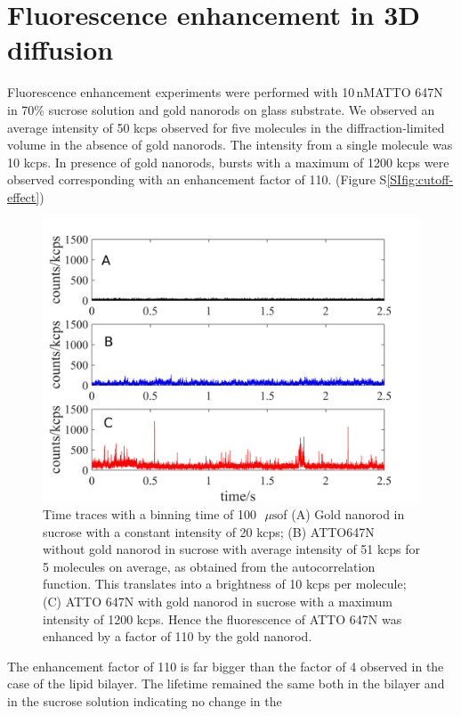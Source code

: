 \documentclass[11pt,a4paper,onecolumn]{article}
\newcommand{\nM}{\ensuremath{\,\textrm{nM}}}
\newcommand{\us}{\ensuremath{\,\mu\textrm{s}}}
\begin{document}
\section{Fluorescence enhancement in 3D diffusion}
Fluorescence enhancement experiments were performed with 10\nM ATTO 647N in 70\% sucrose solution and gold 
nanorods on glass substrate. We observed an average intensity of 50 kcps observed for five molecules in the 
diffraction-limited volume in the absence of gold nanorods. The intensity from a single molecule was 10 kcps. 
In presence of gold nanorods, bursts with a maximum of 1200 kcps were observed corresponding with an enhancement 
factor of 110. (Figure S\ref{SIfig:cutoff-effect})\\
\begin{figure}[ht]
  \centering
  \includegraphics[width=\textwidth]{3D_enhc.png}
  \makeatletter
  \renewcommand{\fnum@figure}{\figurename~S\thefigure}
  \makeatother{}
  \caption{Time traces with a binning time of 100~\us of (A) Gold nanorod in sucrose with a constant intensity of 
  20 kcps; (B) ATTO647N without gold nanorod in sucrose with average intensity of 51 kcps for 5 molecules on average, 
  as obtained from the autocorrelation function. This translates into a brightness of 10 kcps per molecule; 
  (C) ATTO 647N with gold nanorod in sucrose with a maximum intensity of 1200 kcps. Hence the fluorescence of 
  ATTO 647N was enhanced by a factor of 110 by the gold nanorod.}
  \label{SIfig:3D-enhc}
\end{figure}
The enhancement factor of 110 is far bigger than the factor of 4 observed in the case of the lipid bilayer. 
The lifetime remained the same both in the bilayer and in the sucrose solution indicating no change in the 
\end{document}
